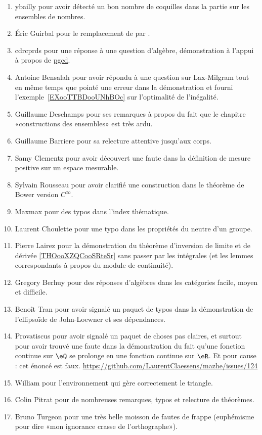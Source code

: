 \begin{enumerate}
    \item
        ybailly pour avoir détecté un bon nombre de coquilles dans la partie sur les ensembles de nombres.
    \item
        Éric Guirbal pour le remplacement de  par .
    \item
        cdrcprds pour une réponse à une question d'algèbre, démonstration à l'appui à propos de \href{https://github.com/LaurentClaessens/mazhe/issues/52#issuecomment-333251728}{pgcd}.
    \item
        Antoine Bensalah pour avoir répondu à une question sur Lax-Milgram tout en même temps que pointé une erreur dans la démonstration et fourni l'exemple~\ref{EXooTTBDooUNhBOc} sur l'optimalité de l'inégalité.
    \item
        Guillaume Deschamps pour ses remarques à propos du fait que le chapitre «constructions des ensembles» est très ardu.
    \item
        Guillaume Barriere pour sa relecture attentive jusqu'aux corps.
    \item
        Samy Clementz pour avoir découvert une faute dans la définition de mesure positive sur un espace mesurable.
    \item
        Sylvain Rousseau pour avoir clarifié une construction dans le théorème de Bower version \(  C^{\infty}\).
    \item
        Maxmax pour des typos dans l'index thématique.
    \item
        Laurent Choulette pour une typo dans les propriétés du neutre d'un groupe.
    \item
        Pierre Lairez pour la démonstration du théorème d'inversion de limite et de dérivée \ref{THOooXZQCooSRteSr} sans passer par les intégrales (et les lemmes correspondants à propos du module de continuité).
    \item
        Gregory Berhuy pour des réponses d'algèbres dans les catégories facile, moyen et difficile.
    \item
        Benoît Tran pour avoir signalé un paquet de typos dans la démonstration de l'ellipsoïde de John-Loewner et ses dépendances.
    \item
        Provatiscus pour avoir signalé un paquet de choses pas claires, et surtout pour avoir trouvé une faute dans la démonstration du fait qu'une fonction continue sur \( \eQ\) se prolonge en une fonction continue sur \( \eR\). Et pour cause : cet énoncé est faux. \url{https://github.com/LaurentClaessens/mazhe/issues/124}
    \item 
        William pour l'environnement  qui gère correctement le triangle.
    \item
        Colin Pitrat pour de nombreuses remarques, typos et relecture de théorèmes.
    \item
        Bruno Turgeon pour une très belle moisson de fautes de frappe (euphémisme pour dire «mon ignorance crasse de l'orthographe»).
\end{enumerate}

